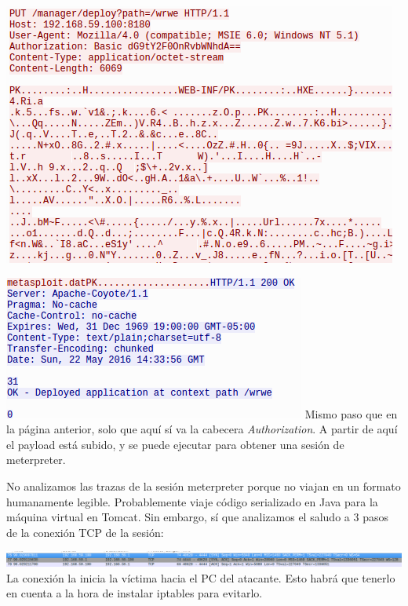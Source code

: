 \documentclass[a4paper,12pt]{scrartcl}
\begin{document}
\begin{center}
	\includegraphics[width=1\linewidth]{cap4-1}
\end{center}
\begin{center}
	\includegraphics[width=1\linewidth]{cap4-2}
	Mismo paso que en la página anterior, solo que aquí sí va la cabecera \textit{Authorization}. A partir de aquí el payload está subido, y se puede ejecutar para obtener una sesión de meterpreter. 
\end{center}

No analizamos las trazas de la sesión meterpreter porque no viajan en un formato humanamente legible. Probablemente viaje código serializado en Java para la máquina virtual en Tomcat. Sin embargo, sí que analizamos el saludo a 3 pasos de la conexión TCP de la sesión:

\newpage

\begin{center}
	\includegraphics[width=1\linewidth]{cap5}
	La conexión la inicia la víctima hacia el PC del atacante. Esto habrá que tenerlo en cuenta a la hora de instalar iptables para evitarlo.
\end{center}
\end{document}
